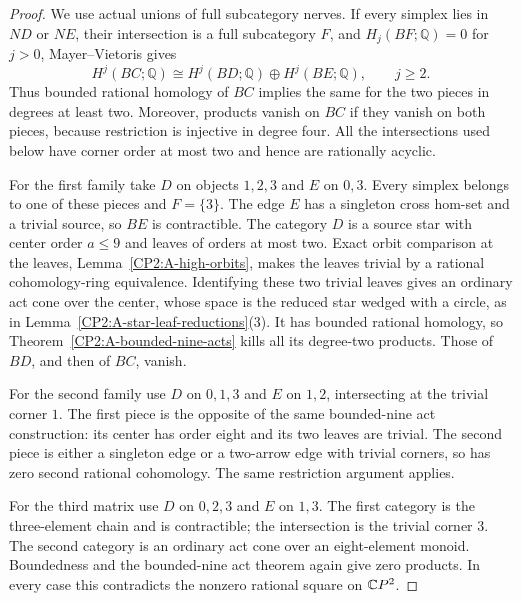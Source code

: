 \begin{proof}
We use actual unions of full subcategory nerves. If every simplex
lies in $ND$ or $NE$, their intersection is a full subcategory $F$,
and $H_j(BF;\mathbb Q)=0$ for $j>0$, Mayer--Vietoris gives
\[
 H^j(BC;\mathbb Q)\cong
 H^j(BD;\mathbb Q)\oplus H^j(BE;\mathbb Q),\qquad j\geq2.
\]
Thus bounded rational homology of $BC$ implies the same for the two
pieces in degrees at least two. Moreover, products vanish on $BC$
if they vanish on both pieces, because restriction is injective
in degree four. All the intersections used below have corner
order at most two and hence are rationally acyclic.

For the first family take $D$ on objects $1,2,3$ and $E$ on $0,3$.
Every simplex belongs to one of these pieces and $F=\{3\}$.
The edge $E$ has a singleton cross hom-set and a trivial source,
so $BE$ is contractible. The category $D$ is a source star with
center order $a\leq9$ and leaves of orders at most two. Exact
orbit comparison at the leaves, Lemma~\ref{CP2:A-high-orbits},
makes the leaves trivial by a rational cohomology-ring
equivalence. Identifying these two trivial leaves gives an
ordinary act cone over the center, whose space is the reduced
star wedged with a circle, as in
Lemma~\ref{CP2:A-star-leaf-reductions}(3). It has bounded rational
homology, so Theorem~\ref{CP2:A-bounded-nine-acts} kills all its
degree-two products. Those of $BD$, and then of $BC$, vanish.

For the second family use $D$ on $0,1,3$ and $E$ on $1,2$,
intersecting at the trivial corner $1$. The first piece is the
opposite of the same bounded-nine act construction: its center
has order eight and its two leaves are trivial. The second piece
is either a singleton edge or a two-arrow edge with trivial
corners, so has zero second rational cohomology. The same
restriction argument applies.

For the third matrix use $D$ on $0,2,3$ and $E$ on $1,3$.
The first category is the three-element chain and is contractible;
the intersection is the trivial corner $3$. The second category
is an ordinary act cone over an eight-element monoid. Boundedness
and the bounded-nine act theorem again give zero products.
In every case this contradicts the nonzero rational square on
$\mathbb{C}P^2$.
\end{proof}
